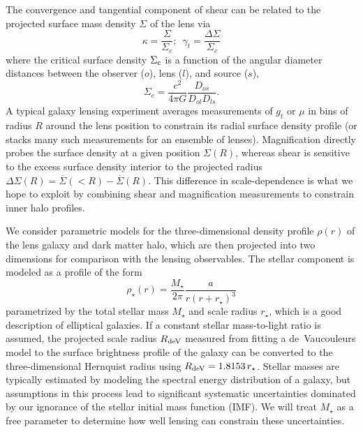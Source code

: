 \documentclass[12pt]{emulateapj}
\begin{document}
The convergence and tangential component of shear can be related to the
projected surface mass density $\Sigma$ of the lens via
\begin{equation}
\kappa = \frac{\Sigma}{\Sigma_c}; \,\,\, \gamma_t = \frac{\Delta\Sigma}{\Sigma_c}
\end{equation}
where the critical surface density $\Sigma_{\rm  c}$ is a function of
the angular diameter distances between the observer ($o$), lens ($l$),
and source ($s$),
\begin{equation}
\Sigma_{c}=\frac{c^2}{4\pi G}\frac{D_{os}}{D_{ol}D_{ls}}.
\end{equation}
A typical galaxy lensing experiment averages measurements of $g_t$ or $\mu$ in
bins of radius $R$ around the lens position to constrain its radial
surface density profile (or stacks many such measurements for an
ensemble of lenses). Magnification directly probes the surface density
at a given position $\Sigma(R)$, whereas shear is sensitive to the
excess surface density interior to the projected radius
$\Delta\Sigma(R) = \overline{\Sigma}(<R) - \overline{\Sigma}(R)$. This
difference in scale-dependence is what we hope to exploit by combining
shear and magnification measurements to constrain inner halo profiles.

We consider parametric models for the three-dimensional density
profile $\rho(r)$ of the lens galaxy and dark matter halo, which are
then projected into two dimensions for comparison with the lensing
observables. The stellar component is modeled as a
\citet{Hernquist1990} profile of the form
\begin{equation}
\rho_{\star}(r) = \frac{M_{\star}}{2\pi} \frac{a}{r(r+r_{\star})^3}
\label{eq:hernquist}
\end{equation}
parametrized by the total stellar mass $M_{\star}$ and scale radius
$r_{\star}$, which is a good description of elliptical galaxies. If a
constant stellar mass-to-light ratio is assumed, the 
projected scale radius $R_{\rm deV}$ measured from fitting a
de~Vaucouleurs model to the surface brightness profile of the galaxy
can be converted to the three-dimensional Hernquist radius using $R_{\rm
  deV}=1.8153\,r_{\star}$. Stellar masses are typically
estimated by modeling the spectral energy distribution of a galaxy,
but assumptions in this process lead to significant systematic
uncertainties dominated by our ignorance of the stellar initial mass
function (IMF). We will treat $M_{\star}$ as a free parameter to
determine how well lensing can constrain these uncertainties.
\end{document}
